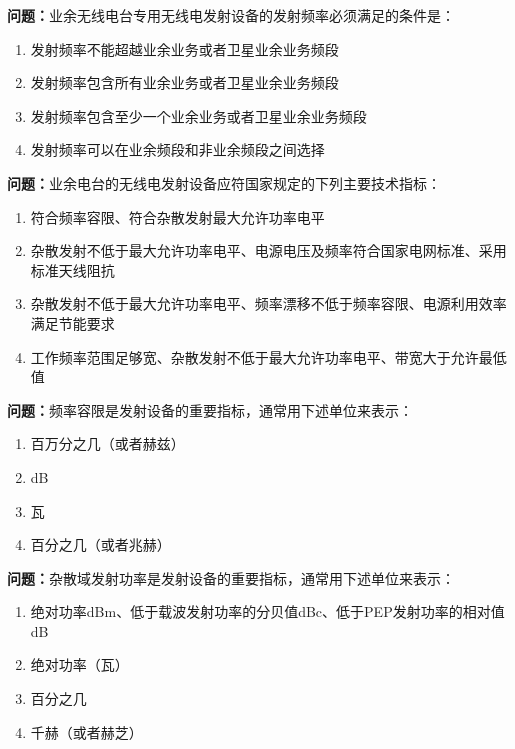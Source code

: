 \bigskip


\noindent\textbf{问题：}业余无线电台专用无线电发射设备的发射频率必须满足的条件是：
\begin{enumerate}[label=\Alph*), leftmargin=3em]
\item 发射频率不能超越业余业务或者卫星业余业务频段
\item 发射频率包含所有业余业务或者卫星业余业务频段
\item 发射频率包含至少一个业余业务或者卫星业余业务频段
\item 发射频率可以在业余频段和非业余频段之间选择
\end{enumerate}

\bigskip


\noindent\textbf{问题：}业余电台的无线电发射设备应符国家规定的下列主要技术指标：
\begin{enumerate}[label=\Alph*), leftmargin=3em]
\item 符合频率容限、符合杂散发射最大允许功率电平
\item 杂散发射不低于最大允许功率电平、电源电压及频率符合国家电网标准、采用标准天线阻抗
\item 杂散发射不低于最大允许功率电平、频率漂移不低于频率容限、电源利用效率满足节能要求
\item 工作频率范围足够宽、杂散发射不低于最大允许功率电平、带宽大于允许最低值
\end{enumerate}

\bigskip


\noindent\textbf{问题：}频率容限是发射设备的重要指标，通常用下述单位来表示：
\begin{enumerate}[label=\Alph*), leftmargin=3em]
\item 百万分之几（或者赫兹）
\item dB
\item 瓦
\item 百分之几（或者兆赫）
\end{enumerate}

\bigskip


\noindent\textbf{问题：}杂散域发射功率是发射设备的重要指标，通常用下述单位来表示：
\begin{enumerate}[label=\Alph*), leftmargin=3em]
\item 绝对功率dBm、低于载波发射功率的分贝值dBc、低于PEP发射功率的相对值dB
\item 绝对功率（瓦）
\item 百分之几
\item 千赫（或者赫芝）
\end{enumerate}

